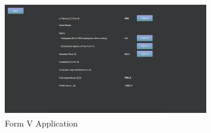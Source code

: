 \begin{figure}[!h]
\begin{center}
\includegraphics[width=9cm, height=5cm]{figures/FormV}
\end{center}
\caption{Form V Application}
\label{fig:FormV}
\end{figure}
